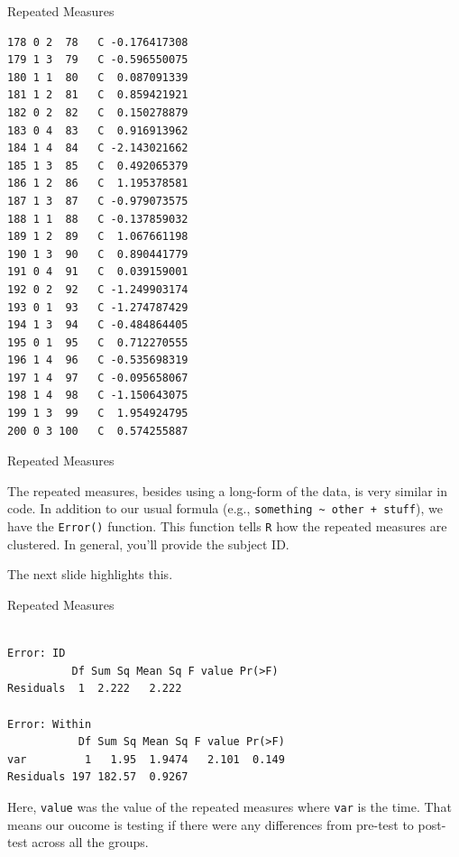 \begin{frame}[fragile]{Repeated Measures}
\begin{verbatim}
178 0 2  78   C -0.176417308
179 1 3  79   C -0.596550075
180 1 1  80   C  0.087091339
181 1 2  81   C  0.859421921
182 0 2  82   C  0.150278879
183 0 4  83   C  0.916913962
184 1 4  84   C -2.143021662
185 1 3  85   C  0.492065379
186 1 2  86   C  1.195378581
187 1 3  87   C -0.979073575
188 1 1  88   C -0.137859032
189 1 2  89   C  1.067661198
190 1 3  90   C  0.890441779
191 0 4  91   C  0.039159001
192 0 2  92   C -1.249903174
193 0 1  93   C -1.274787429
194 1 3  94   C -0.484864405
195 0 1  95   C  0.712270555
196 1 4  96   C -0.535698319
197 1 4  97   C -0.095658067
198 1 4  98   C -1.150643075
199 1 3  99   C  1.954924795
200 0 3 100   C  0.574255887
\end{verbatim}

\end{frame}

\begin{frame}[fragile]{Repeated Measures}

\Large
The repeated measures, besides using a long-form of the data, is very
similar in code. In addition to our usual formula (e.g.,
\texttt{something\ \textasciitilde{}\ other\ +\ stuff}), we have the
\texttt{Error()} function. This function tells \texttt{R} how the
repeated measures are clustered. In general, you'll provide the subject
ID.

The next slide highlights this.

\end{frame}

\begin{frame}[fragile]{Repeated Measures}

\small

\begin{Shaded}
\begin{Highlighting}[]
\StringTok{ }\OperatorTok{~}\StringTok{ }\OperatorTok{+}\StringTok{ }
\end{Highlighting}
\end{Shaded}

\begin{verbatim}

Error: ID
          Df Sum Sq Mean Sq F value Pr(>F)
Residuals  1  2.222   2.222               

Error: Within
           Df Sum Sq Mean Sq F value Pr(>F)
var         1   1.95  1.9474   2.101  0.149
Residuals 197 182.57  0.9267               
\end{verbatim}

\normalsize
Here, \texttt{value} was the value of the repeated measures where
\texttt{var} is the time. That means our oucome is testing if there were
any differences from pre-test to post-test across all the groups.

\end{frame}

